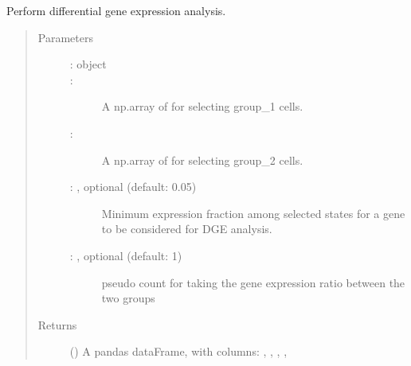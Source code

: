 \documentclass[letterpaper,10pt,english]{sphinxmanual}
\begin{document}
\begin{fulllineitems}
\label{\detokenize{cospar.hf.get_dge_SW:cospar.hf.get_dge_SW}}
Perform differential gene expression analysis.
\begin{quote}\begin{description}
\item[{Parameters}] \leavevmode\begin{description}
\item[{ :  object}] \leavevmode


\item[{ : }] \leavevmode
A np.array of  for selecting group\_1 cells.

\item[{ : }] \leavevmode
A np.array of  for selecting group\_2 cells.

\item[{ : , optional (default: 0.05)}] \leavevmode
Minimum expression fraction among selected states for a
gene to be considered for DGE analysis.

\item[{ : , optional (default: 1)}] \leavevmode
pseudo count for taking the gene expression ratio between the two groups

\end{description}

\item[{Returns}] \leavevmode
{} () \textendash{} A pandas dataFrame, with columns: , , , , 

\end{description}\end{quote}

\end{fulllineitems}
\end{document}
